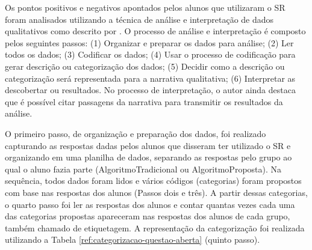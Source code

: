 Os pontos positivos e negativos apontados pelos alunos que utilizaram o SR foram analisados utilizando a técnica de análise
e interpretação de dados qualitativos como descrito por . O processo de análise e interpretação
é composto pelos seguintes passos: (1) Organizar e preparar os dados para análise;
(2) Ler todos os dados; (3) Codificar os dados; (4) Usar o processo de codificação para gerar descrição ou categorização
dos dados; (5) Decidir como a descrição ou categorização será representada para a narrativa qualitativa; (6) Interpretar
as descobertar ou resultados. No processo de interpretação, o autor ainda destaca que é possível citar passagens da narrativa
para transmitir os resultados da análise.

O primeiro passo, de organização e preparação dos dados, foi realizado capturando as respostas dadas pelos alunos que disseram
ter utilizado o SR e organizando em uma planilha de dados, separando as respostas pelo grupo ao qual o aluno fazia parte
(AlgoritmoTradicional ou AlgoritmoProposta). Na sequência, todos dados foram lidos e vários códigos (categorias) foram
propostos com base nas respostas dos alunos (Passos dois e três). A partir dessas categorias, o quarto passo foi ler as
respostas dos alunos e contar quantas vezes cada uma das categorias propostas apareceram nas respostas dos alunos de
cada grupo, também chamado de etiquetagem. A representação da categorização foi realizada utilizando a Tabela
\ref{ref:categorizacao-questao-aberta} (quinto passo).

